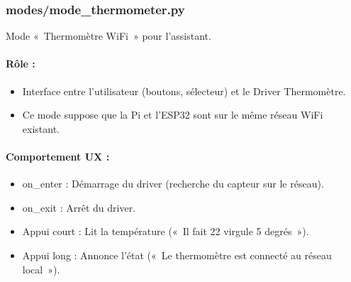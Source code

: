 \documentclass[letterpaper,10pt,french]{sphinxmanual}
\begin{document}
\subsubsection{modes/mode\_thermometer.py}
\label{\detokenize{api/modes:modes-mode-thermometer-py}}
\sphinxAtStartPar
Mode « Thermomètre WiFi » pour l’assistant.


\paragraph{Rôle :}
\label{\detokenize{api/modes:id9}}\begin{itemize}
\item {} 
\sphinxAtStartPar
Interface entre l’utilisateur (boutons, sélecteur) et le Driver Thermomètre.

\item {} 
\sphinxAtStartPar
Ce mode suppose que la Pi et l’ESP32 sont sur le même réseau WiFi existant.

\end{itemize}


\paragraph{Comportement UX :}
\label{\detokenize{api/modes:id10}}\begin{itemize}
\item {} 
\sphinxAtStartPar
on\_enter : Démarrage du driver (recherche du capteur sur le réseau).

\item {} 
\sphinxAtStartPar
on\_exit : Arrêt du driver.

\item {} 
\sphinxAtStartPar
Appui court : Lit la température (« Il fait 22 virgule 5 degrés »).

\item {} 
\sphinxAtStartPar
Appui long : Annonce l’état (« Le thermomètre est connecté au réseau local »).

\end{itemize}
\end{document}
